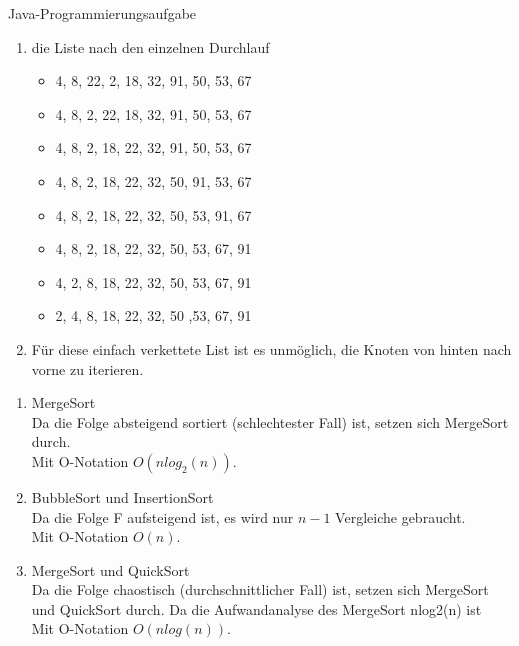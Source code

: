 \documentclass[12pt]{scrartcl}
\begin{document}
Java-Programmierungsaufgabe

\begin{enumerate}
  \item die Liste nach den einzelnen Durchlauf
    \begin{itemize}
      \item 4, 8, 22, 2, 18, 32, 91, 50, 53, 67
      \item 4, 8, 2, 22, 18, 32, 91, 50, 53, 67
      \item 4, 8, 2, 18, 22, 32, 91, 50, 53, 67
      \item 4, 8, 2, 18, 22, 32, 50, 91, 53, 67
      \item 4, 8, 2, 18, 22, 32, 50, 53, 91, 67
      \item 4, 8, 2, 18, 22, 32, 50, 53, 67, 91
      \item 4, 2, 8, 18, 22, 32, 50, 53, 67, 91
      \item 2, 4, 8, 18, 22, 32, 50 ,53, 67, 91
    \end{itemize} 
  \item Für diese einfach verkettete List ist es unmöglich, die Knoten von hinten nach vorne zu iterieren.
\end{enumerate}

\begin{enumerate}
  \item MergeSort\\
    Da die Folge absteigend sortiert (schlechtester Fall) ist, setzen sich MergeSort durch.\\
    Mit O-Notation $O(nlog_2(n))$.
  \item BubbleSort und InsertionSort\\
    Da die Folge F aufsteigend ist, es wird nur $n-1$ Vergleiche gebraucht.\\
    Mit O-Notation $O(n)$.
  \item MergeSort und QuickSort\\
    Da die Folge chaostisch (durchschnittlicher Fall) ist, setzen sich MergeSort und QuickSort durch.
    Da die Aufwandanalyse des MergeSort nlog2(n) ist\\
    Mit O-Notation $O(nlog(n))$.
\end{enumerate}
\end{document}
